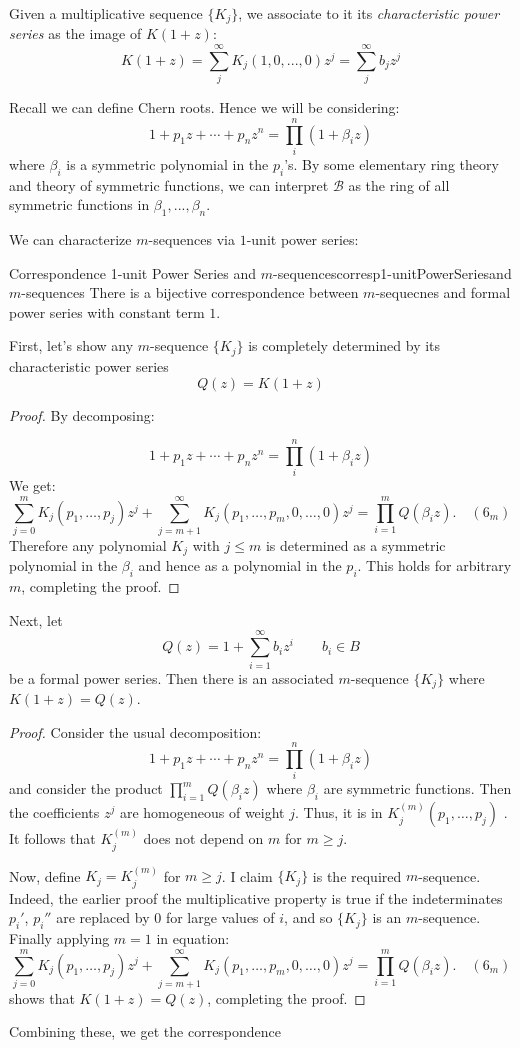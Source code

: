 \documentclass{book}
\newcommand{\CB}{{\mathcal{B}}}
\begin{document}
Given a multiplicative sequence $\{K_j\}$, we associate to it its \emph{characteristic power series} as the
image of $K(1+z)$:
\[
  K(1+z) = \sum_j^\infty K_j(1, 0, ..., 0)z^j = \sum_j^\infty b_jz^j
\]

Recall we can define Chern roots. Hence we will be considering:
\[
  1 + p_1z + \cdots + p_nz^n = \prod_i^n \left(1 + \beta_iz\right)
\]
where $\beta_i$ is a symmetric polynomial in the $p_i$'s. By some elementary ring theory and theory of
symmetric functions, we can interpret $\CB$ as the ring of all symmetric functions in $\beta_1, ..., \beta_n$.


We can characterize $m$-sequences via $1$-unit power series:

\begin{prop}{Correspondence 1-unit Power Series and $m$-sequences}{corresp1-unitPowerSeriesand$m$-sequences}
  There is a bijective correspondence between $m$-sequecnes and formal power series with constant term $1$.
\end{prop}

\begin{Proof}
    First, let's show any $m$-sequence $\{K_j\}$ is completely determined by its characteristic power series
    \[
      Q(z) = K(1+z)
    \]
   \begin{proof}
    By decomposing:

  \[
    1 + p_1z + \cdots + p_nz^n = \prod_i^n \left(1 + \beta_iz\right)
  \]
  We get:
  \[
  \sum_{j=0}^m K_j(p_1,\ldots,p_j) z^j + \sum_{j=m+1}^{\infty} K_j(p_1,\ldots,p_m,0,\ldots,0) z^j = \prod_{i=1}^m Q(\beta_i z). \quad (6_m)
  \]
  Therefore any polynomial $K_j$ with $j \leq m$ is determined as a symmetric polynomial in the $\beta_i$ and
  hence as a polynomial in the $p_i$. This holds for arbitrary $m$, completing the proof.
  \end{proof}

  Next, let
    \[
      Q(z) = 1 + \sum_{i=1}^\infty b_iz^i \qquad b_i \in B
    \]
    be a formal power series. Then there is an associated $m$-sequence $\{K_j\}$ where $K(1+z) = Q(z)$.
  \begin{proof}
    Consider the usual decomposition:
    \[
      1 + p_1z + \cdots + p_nz^n = \prod_i^n \left(1 + \beta_iz\right)
    \]
    and consider the product $\prod_{i=1}^m Q(\beta_i z)$ where $\beta_i$ are symmetric functions. Then the
    coefficients $z^j$ are homogeneous of weight $j$. Thus, it is in $K_j^{(m)}(p_1,\ldots,p_j)$ . It follows that $K_j^{(m)}$
    does not depend on $m$ for $m \geq j$.

    Now, define $K_j = K_j^{(m)}$ for $m \geq j$. I claim $\{K_j\}$ is
    the required $m$-sequence. Indeed, the earlier proof the
    multiplicative property is true if the indeterminates $p_i'$, $p_i''$ are replaced by 0
    for large values of $i$, and so $\{K_j\}$ is an $m$-sequence. Finally applying $m = 1$ in equation:
    \[
    \sum_{j=0}^m K_j(p_1,\ldots,p_j) z^j + \sum_{j=m+1}^{\infty} K_j(p_1,\ldots,p_m,0,\ldots,0) z^j = \prod_{i=1}^m Q(\beta_i z). \quad (6_m)
    \]
    shows that $K(1 + z) = Q(z)$, completing the proof.
  \end{proof}

  Combining these, we get the correspondence
\end{Proof}
\end{document}
